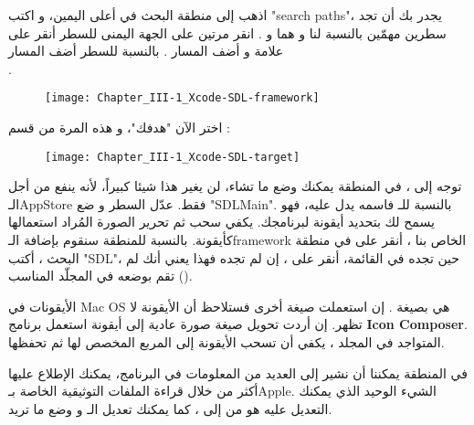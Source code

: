 اذهب إلى منطقة البحث في أعلى اليمين، و اكتب
"\textenglish{search paths}"،
يجدر بك أن تجد سطرين مهمّين بالنسبة لنا و هما
و 
.
انقر مرتين على الجهة اليمنى للسطر 
أنقر على علامة
\InlineCode{+}
 و أضف المسار
.
بالنسبة للسطر 
أضف المسار\\
.

\begin{figure}[H]
	\centering
	\texttt{[image: Chapter\_III-1\_Xcode-SDL-framework]}
\end{figure}

اختر الآن "هدفك"، و هذه المرة من قسم 
 :

\begin{figure}[H]
	\centering
	\texttt{[image: Chapter\_III-1\_Xcode-SDL-target]}
\end{figure}

توجه إلى 
،
في المنطقة
يمكنك وضع ما تشاء، لن يغير هذا شيئا كبيراً، لأنه ينفع من أجل الـ\textenglish{AppStore}
فقط. عدّل السطر 
و ضع 
"\textenglish{SDLMain}".
بالنسبة للـ
فاسمه يدل عليه، فهو يسمح لك بتحديد أيقونة لبرنامجك. يكفي سحب ثم تحرير الصورة المُراد استعمالها كأيقونة. بالنسبة للمنطقة 
سنقوم بإضافة الـ\textenglish{framework}
الخاص بنا
،
أنقر على
\InlineCode{+}
في منطقة البحث ، أكتب 
"\textenglish{SDL}"،
حين تجده في القائمة، أنقر على 
،
إن لم تجده فهذا يعني أنك لم تقم بوضعه في المجلّد المناسب 
().

\begin{information}
الأيقونات في
\textenglish{Mac OS}
هي بصيغة
.
إن استعملت صيغة أخرى فستلاحظ أن الأيقونة لا تظهر. إن أردت تحويل صيغة صورة عادية إلى أيقونة استعمل برنامج 
\textbf{\textenglish{Icon Composer}}.
المتواجد في المجلد
،
يكفي أن تسحب الأيقونة إلى المربع المخصص لها ثم تحفظها.
\end{information}

في المنطقة 
يمكننا أن نشير إلى العديد من المعلومات في البرنامج، يمكنك الإطلاع عليها أكثر من خلال قراءة الملفات التوثيقية الخاصة بـ\textenglish{Apple}.
الشيء الوحيد الذي يمكنك التعديل عليه هو 
من 
إلى 
،
كما يمكنك تعديل الـ
و وضع ما تريد.

